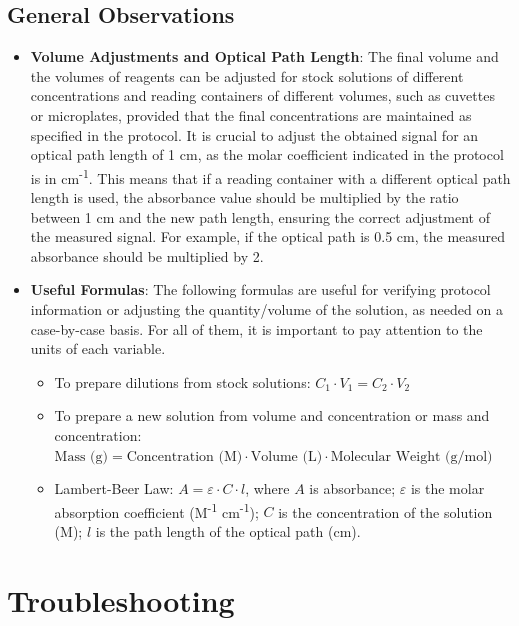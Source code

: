 \documentclass[
  9pt,
  american,
  a5paper,
  extrafontsizes,onecolumn,openright
  ]{memoir}
\providecommand{\tightlist}{%
  \setlength{\itemsep}{0pt}\setlength{\parskip}{0pt}}
\begin{document}
\normalsize

\subsection{General Observations}\label{general-observations}

\begin{itemize}
\item
  \textbf{Volume Adjustments and Optical Path Length}: The final volume and the volumes of reagents can be adjusted for stock solutions of different concentrations and reading containers of different volumes, such as cuvettes or microplates, provided that the final concentrations are maintained as specified in the protocol. It is crucial to adjust the obtained signal for an optical path length of 1 cm, as the molar coefficient indicated in the protocol is in cm\textsuperscript{-1}. This means that if a reading container with a different optical path length is used, the absorbance value should be multiplied by the ratio between 1 cm and the new path length, ensuring the correct adjustment of the measured signal. For example, if the optical path is 0.5 cm, the measured absorbance should be multiplied by 2.
\item
  \textbf{Useful Formulas}: The following formulas are useful for verifying protocol information or adjusting the quantity/volume of the solution, as needed on a case-by-case basis. For all of them, it is important to pay attention to the units of each variable.

  \begin{itemize}
  \tightlist
  \item
    To prepare dilutions from stock solutions: \(C_1 \cdot V_1 = C_2 \cdot V_2\)
  \item
    To prepare a new solution from volume and concentration or mass and concentration: \(\text{Mass (g)} = \text{Concentration (M)} \cdot \text{Volume (L)} \cdot \text{Molecular Weight (g/mol)}\)
  \item
    Lambert-Beer Law: \(A = \varepsilon \cdot C \cdot l\), where \(A\) is absorbance; \(\varepsilon\) is the molar absorption coefficient (M\textsuperscript{-1} cm\textsuperscript{-1}); \(C\) is the concentration of the solution (M); \(l\) is the path length of the optical path (cm).
  \end{itemize}
\end{itemize}

\section{Troubleshooting}\label{troubleshooting}
\end{document}
